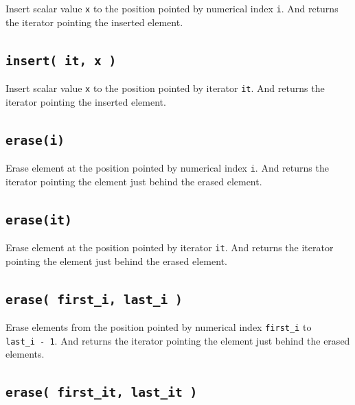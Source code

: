 \documentclass[]{book}
\begin{document}
Insert scalar value \texttt{x} to the position pointed by numerical index \texttt{i}. And returns the iterator pointing the inserted element.

\hypertarget{insert-it-x}{%
\subsection{\texorpdfstring{\texttt{insert(\ it,\ x\ )}}{insert( it, x )}}\label{insert-it-x}}

Insert scalar value \texttt{x} to the position pointed by iterator \texttt{it}. And returns the iterator pointing the inserted element.

\hypertarget{erasei}{%
\subsection{\texorpdfstring{\texttt{erase(i)}}{erase(i)}}\label{erasei}}

Erase element at the position pointed by numerical index \texttt{i}. And returns the iterator pointing the element just behind the erased element.

\hypertarget{eraseit}{%
\subsection{\texorpdfstring{\texttt{erase(it)}}{erase(it)}}\label{eraseit}}

Erase element at the position pointed by iterator \texttt{it}. And returns the iterator pointing the element just behind the erased element.

\hypertarget{erase-first_i-last_i}{%
\subsection{\texorpdfstring{\texttt{erase(\ first\_i,\ last\_i\ )}}{erase( first\_i, last\_i )}}\label{erase-first_i-last_i}}

Erase elements from the position pointed by numerical index \texttt{first\_i} to \texttt{last\_i\ -\ 1}. And returns the iterator pointing the element just behind the erased elements.

\hypertarget{erase-first_it-last_it}{%
\subsection{\texorpdfstring{\texttt{erase(\ first\_it,\ last\_it\ )}}{erase( first\_it, last\_it )}}\label{erase-first_it-last_it}}
\end{document}
